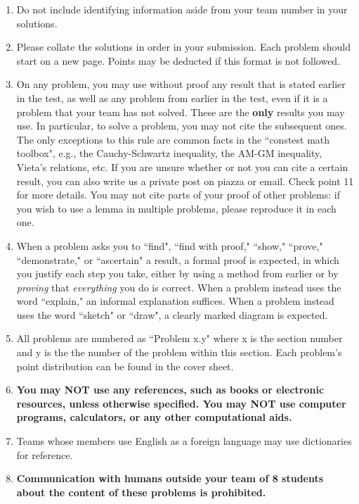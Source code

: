 \documentclass[11pt]{article}
\begin{document}
\begin{enumerate}
\item Do not include identifying information aside from your team number in your solutions.

\item Please collate the solutions in order in your submission. Each problem should start on a new page. Points may be deducted if this format is not followed. 

\item On any problem, you may use without proof any result that is stated earlier in the test, as well as any problem from earlier in the test, even if it is a problem that your team has not solved. These are the \textbf{only} results you may use. In particular, to solve a problem, you may not cite the subsequent ones. The only exceptions to this rule are common facts in the ``constest math toolbox", e.g., the Cauchy-Schwartz inequality, the AM-GM inequality, Vieta's relations, etc. If you are unsure whether or not you can cite a certain result, you can also write us a private post on piazza or email. Check point 11 for more details. You may not cite parts of your proof of other problems: if you wish to use a lemma in multiple problems, please reproduce it in each one. 

\item When a problem asks you to ``find", ``find with proof," ``show," ``prove," ``demonstrate," or ``ascertain" a result, a formal proof is expected, in which you justify each step you take, either by using a method from earlier or by \emph{proving} that \emph{everything} you do is correct. When a problem instead uses the word ``explain," an informal explanation suffices. When a problem instead uses the word ``sketch" or ``draw", a clearly marked diagram is expected. 

\item All problems are numbered as ``Problem x.y" where x is the section number and y is the the number of the problem within this section. Each problem's point distribution can be found in the cover sheet.

\item \textbf{You may NOT use any references, such as books or electronic resources, unless otherwise specified. You may NOT use computer programs, calculators, or any other computational aids.}

\item Teams whose members use English as a foreign language may use dictionaries for reference. 

\item \textbf{Communication with humans outside your team of 8 students about the content of these problems is prohibited.}


\end{enumerate}
\end{document}

